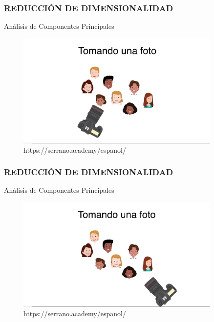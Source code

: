 \documentclass{beamer}
\begin{document}
\begin{frame}
\frametitle{REDUCCIÓN DE DIMENSIONALIDAD}
\begin{block}{Análisis de Componentes Principales}	
	\begin{figure}
		\includegraphics[width=0.9\textwidth]{PCA/IMG_3527.jpg}
		\caption{https://serrano.academy/espanol/}
	\end{figure}
\end{block}
\end{frame}

\begin{frame}
\frametitle{REDUCCIÓN DE DIMENSIONALIDAD}
\begin{block}{Análisis de Componentes Principales}	
	\begin{figure}
		\includegraphics[width=0.9\textwidth]{PCA/IMG_3528.jpg}
		\caption{https://serrano.academy/espanol/}
	\end{figure}
\end{block}
\end{frame}
\end{document}
